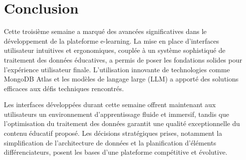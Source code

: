 \section{Conclusion}

Cette troisième semaine a marqué des avancées significatives dans le développement de la plateforme e-learning. La mise en place d'interfaces utilisateur intuitives et ergonomiques, couplée à un système sophistiqué de traitement des données éducatives, a permis de poser les fondations solides pour l'expérience utilisateur finale. L'utilisation innovante de technologies comme MongoDB Atlas et les modèles de langage large (LLM) a apporté des solutions efficaces aux défis techniques rencontrés.

Les interfaces développées durant cette semaine offrent maintenant aux utilisateurs un environnement d'apprentissage fluide et immersif, tandis que l'optimisation du traitement des données garantit une qualité exceptionnelle du contenu éducatif proposé. Les décisions stratégiques prises, notamment la simplification de l'architecture de données et la planification d'éléments différenciateurs, posent les bases d'une plateforme compétitive et évolutive. 